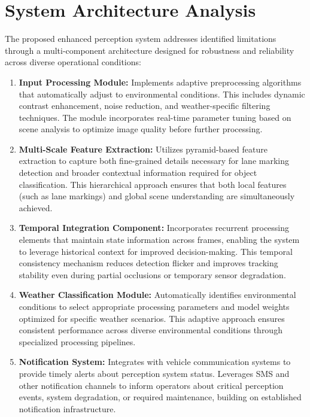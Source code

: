\section{System Architecture Analysis}
\begin{doublespace}
The proposed enhanced perception system addresses identified limitations through a multi-component architecture designed for robustness and reliability across diverse operational conditions:

\begin{enumerate}[leftmargin=*,nosep]
    \item \textbf{Input Processing Module:} Implements adaptive preprocessing algorithms that automatically adjust to environmental conditions. This includes dynamic contrast enhancement, noise reduction, and weather-specific filtering techniques. The module incorporates real-time parameter tuning based on scene analysis to optimize image quality before further processing.
    
    \item \textbf{Multi-Scale Feature Extraction:} Utilizes pyramid-based feature extraction to capture both fine-grained details necessary for lane marking detection and broader contextual information required for object classification. This hierarchical approach ensures that both local features (such as lane markings) and global scene understanding are simultaneously achieved.
    
    \item \textbf{Temporal Integration Component:} Incorporates recurrent processing elements that maintain state information across frames, enabling the system to leverage historical context for improved decision-making. This temporal consistency mechanism reduces detection flicker and improves tracking stability even during partial occlusions or temporary sensor degradation.
    
    \item \textbf{Weather Classification Module:} Automatically identifies environmental conditions to select appropriate processing parameters and model weights optimized for specific weather scenarios. This adaptive approach ensures consistent performance across diverse environmental conditions through specialized processing pipelines.
    
    \item \textbf{Notification System:} Integrates with vehicle communication systems to provide timely alerts about perception system status. Leverages SMS and other notification channels to inform operators about critical perception events, system degradation, or required maintenance, building on established notification infrastructure.
\end{enumerate}
\end{doublespace}

